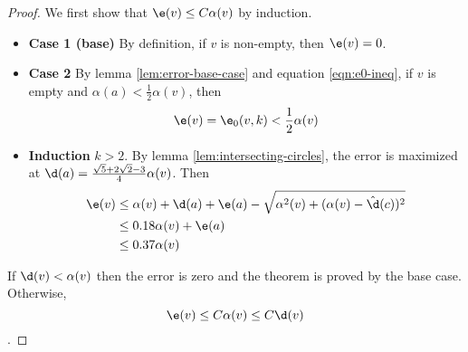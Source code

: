 \begin{proof}
We first show that $\e(v) \le C\alpha(v)$ by induction.
\begin{itemize}
\item[] \textbf{Case 1 (base)} By definition, if $v$ is non-empty, then $\e(v) = 0$.
\item[] \textbf{Case 2} By lemma \ref{lem:error-base-case} and equation \eqref{eqn:e0-ineq}, if $v$ is empty and $\alpha(a) < \frac{1}{2}\alpha(v)$, then
  \[ \e(v) = \e_0(v,k) < \frac{1}{2}\alpha(v) \]
\item[] \textbf{Induction} $k > 2$.  By lemma \ref{lem:intersecting-circles}, the error is maximized at $\d(a) = \frac{\sqrt{5} + 2\sqrt{2} - 3}{4}\alpha(v)$.  Then
\begin{alignat*}{5}
  \e(v) &\le \alpha(v) + \d(a) + \e(a) - \sqrt{\alpha^2(v) + (\alpha(v)-\hat{\d}(c))^2} \\
        &\le 0.18 \alpha(v) + \e(a) \\
        &\le 0.37 \alpha(v)
\end{alignat*}
\end{itemize}
If $\d(v) < \alpha(v)$ then the error is zero and the theorem is proved by the base case.  Otherwise, 
\[ \e(v) \le C\alpha(v) \le C\d(v) \].
\end{proof}

